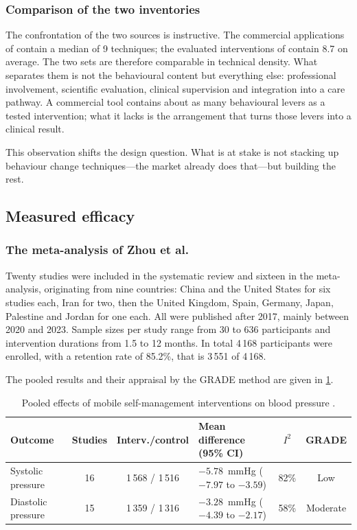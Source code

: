 \documentclass[12pt,a4paper,oneside]{report}
\begin{document}
\subsubsection{Comparison of the two inventories}

The confrontation of the two sources is instructive. The commercial applications of \textcite{alessa2019} contain a median of 9 techniques; the evaluated interventions of \textcite{zhou2024} contain 8.7 on average. The two sets are therefore comparable in technical density. What separates them is not the behavioural content but everything else: professional involvement, scientific evaluation, clinical supervision and integration into a care pathway. A commercial tool contains about as many behavioural levers as a tested intervention; what it lacks is the arrangement that turns those levers into a clinical result.

This observation shifts the design question. What is at stake is not stacking up behaviour change techniques---the market already does that---but building the rest.

\subsection{Measured efficacy}\label{sec:efficacy}

\subsubsection{The meta-analysis of Zhou et al.}

Twenty studies were included in the systematic review and sixteen in the meta-analysis, originating from nine countries: China and the United States for six studies each, Iran for two, then the United Kingdom, Spain, Germany, Japan, Palestine and Jordan for one each. All were published after 2017, mainly between 2020 and 2023. Sample sizes per study range from 30 to 636 participants and intervention durations from 1.5 to 12 months. In total 4\,168 participants were enrolled, with a retention rate of 85.2\%, that is 3\,551 of 4\,168.

The pooled results and their appraisal by the GRADE method are given in \cref{tab:zhou-results}.
\begin{table}[htbp]
\centering\footnotesize
\caption{Pooled effects of mobile self-management interventions on blood pressure \parencite{zhou2024}.}\label{tab:zhou-results}
\begin{tabularx}{\textwidth}{@{}X c c >{\raggedright\arraybackslash}p{2.9cm} c c@{}}
\toprule
\textbf{Outcome} & \textbf{Studies} & \textbf{Interv./control} & \textbf{Mean difference (95\% CI)} & \textbf{$I^2$} & \textbf{GRADE} \\
\midrule
Systolic pressure & 16 & 1\,568 / 1\,516 & $-5.78$~mmHg ($-7.97$ to $-3.59$) & 82\% & Low \\
Diastolic pressure & 15 & 1\,359 / 1\,316 & $-3.28$~mmHg ($-4.39$ to $-2.17$) & 58\% & Moderate \\
\bottomrule
\end{tabularx}
\end{table}
\end{document}
